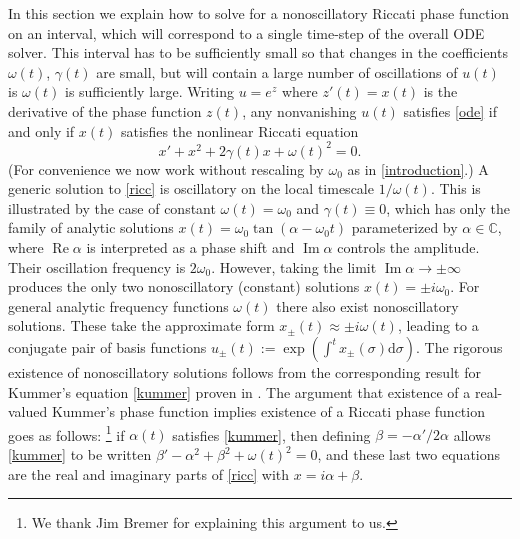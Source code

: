 \documentclass[10pt]{article}
\newcommand{\be}{\begin{equation}}
\newcommand{\ee}{\end{equation}}
\newcommand{\C}{\mathbb{C}}
\renewcommand{\d}{\mathrm{d}} %
\DeclareMathOperator{\im}{Im}
\DeclareMathOperator{\re}{Re}
\newcommand{\om}{\omega}
\newcommand{\g}{\gamma}
\newcommand{\AB}[1]{{\color{orange}#1}}
\begin{document}
%
In this section we explain how to solve for
a nonoscillatory Riccati phase function on an interval,
which will correspond to a single time-step of the overall ODE solver.
This interval has to be sufficiently small so that changes in the coefficients $\om(t)$,
$\g(t)$ are small, but will contain a large number of oscillations of $u(t)$ is
$\om(t)$ is sufficiently large.
Writing $u = e^z$ where $z'(t) = x(t)$ is the derivative of the phase function $z(t)$,
any nonvanishing $u(t)$ satisfies \cref{ode} if and only if $x(t)$ satisfies the nonlinear Riccati equation
\be
x' + x^2 + 2\g(t)x + \om(t)^2 = 0.
\label{ricc}
\ee
(For convenience we now work without rescaling by $\om_0$ as in \cref{introduction}.)
A generic solution to \cref{ricc} is oscillatory
on the local timescale $1/\om(t)$.
This is illustrated by the case of constant $\om(t) = \om_0$
and $\g(t)\equiv 0$,
which has only the family of analytic solutions
$x(t) = \om_0 \tan(\alpha - \om_0t)$ parameterized by $\alpha\in\C$,
where $\re \alpha$ is interpreted as a phase shift and $\im \alpha$
controls the amplitude. Their oscillation frequency is $2\om_0$.
However, taking the limit $\im \alpha \to \pm \infty$ produces
the only two nonoscillatory (constant) solutions $x(t) = \pm i\om_0$.
For general analytic frequency functions $\om(t)$ there
also exist nonoscillatory solutions.
These take the approximate form
$x_{\pm}(t) \approx \pm i\om(t)$, leading to a conjugate pair of basis
functions $u_{\pm}(t) := \exp(\int^t x_\pm(\sigma) \d \sigma)$.
The rigorous existence of nonoscillatory solutions
follows from the corresponding result
for Kummer's equation \cref{kummer} proven in
\cite{heitman2015,bremer2016}.
The argument that existence of a real-valued Kummer's phase function implies
existence of a Riccati phase function goes as follows:%
\footnote{We thank Jim Bremer for explaining this argument to us.}
if $\alpha(t)$ satisfies \cref{kummer},
then defining $\beta = -\alpha'/2\alpha$ allows \cref{kummer}
to be written
$\beta' - \alpha^2 + \beta^2 + \om(t)^2 = 0$, and these last two equations
are the real and imaginary parts of \cref{ricc}
with $x = i\alpha + \beta$.
\end{document}
